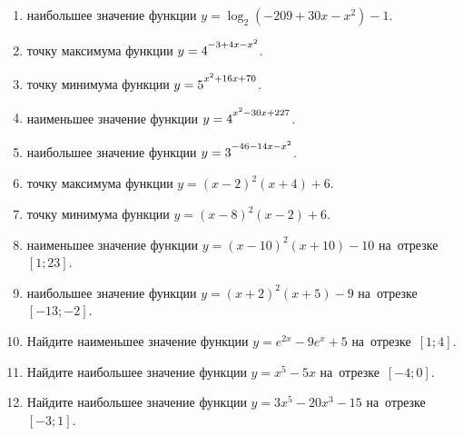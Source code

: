 \documentclass[a4paper,10pt]{article}
\begin{document}
\begin{enumerate}
\item {} наибольшее значение функции $y=\log_2\left(-209+30x-x^2\right)-1$.

\item {} точку максимума функции $y=4\strut^{-3+4x-x^2}$.

\item {} точку минимума функции $y=5\strut^{x^2+16x+70}$.

\item {} наименьшее значение функции $y=4\strut^{x^2-30x+227}$.

\item {} наибольшее значение функции $y=3\strut^{-46-14x-x^2}$.

\item {} точку максимума функции $y=\left(x-2\right)^2\left(x+4\right)+6$.

\item {} точку минимума функции $y=\left(x-8\right)^2\left(x-2\right)+6$.

\item {} наименьшее значение функции $y=\left(x-10\right)^2\left(x+10\right)-10$ на~отрезке~$\left[1;23\right]$.

\item {} наибольшее значение функции $y=\left(x+2\right)^2\left(x+5\right)-9$ на~отрезке~$\left[-13;-2\right]$.

\item Найдите наименьшее значение функции $y=e^{2x}-9e^x+5$ на~отрезке~$\left[1;4\right]$.

\item Найдите наибольшее значение функции $y=x^5-5x$ на~отрезке~$\left[-4;0\right]$.

\item Найдите наибольшее значение функции $y=3x^5-20x^3-15$ на~отрезке~$\left[-3;1\right]$.

\end{enumerate}
\end{document}
